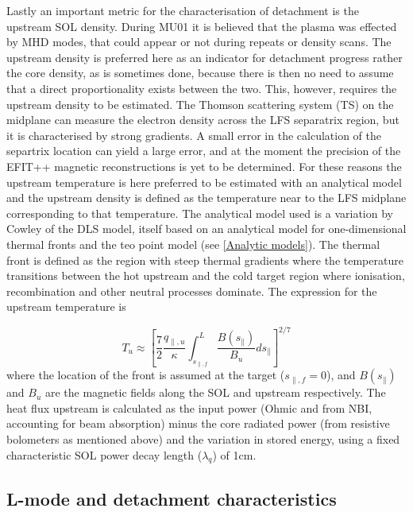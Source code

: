 Lastly an important metric for the characterisation of detachment is the upstream SOL density. During MU01 it is believed that the plasma was effected by MHD modes, that could appear or not during repeats or density scans. The upstream density is preferred here as an indicator for detachment progress rather the core density, as is sometimes done, because there is then no need to assume that a direct proportionality exists between the two. This, however, requires the upstream density to be estimated. The Thomson scattering system (TS) on the midplane can measure the electron density across the LFS separatrix region, but it is characterised by strong gradients. A small error in the calculation of the separtrix location can yield a large error, and at the moment the precision of the EFIT++ magnetic reconstructions is yet to be determined. %
For these reasons the upstream temperature is here preferred to be estimated with an analytical model and the upstream density is defined as the temperature near to the LFS midplane corresponding to that temperature. The analytical model used is a variation by Cowley\cite{Cowley2022} of the DLS model\cite{Lipschultz2016}, itself based on an analytical model for one-dimensional thermal fronts\cite{Hutchinson1994} and the teo point model (see \autoref{Analytic models}). The thermal front is defined as the region with steep thermal gradients where the temperature transitions between the hot upstream and the cold target region where ionisation, recombination and other neutral processes dominate. The expression for the upstream temperature is\cite{Cowley2022}

\begin{equation}
T_u \approx \left [ \frac{7}{2} \frac{q_{\parallel,u}}{\kappa} \int_{s_{\parallel,f}}^{L} \frac{B(s_{\parallel})}{B_u} ds_{\parallel} \right ]^{2/7}
\label{eq:thomo1}
\end{equation}
where the location of the front is assumed at the target ($s_{\parallel,f}=0$), and $B(s_{\parallel})$ and ${B_u}$ are the magnetic fields along the SOL and upstream respectively. The heat flux upstream is calculated as the input power (Ohmic and from NBI, accounting for beam absorption) minus the core radiated power (from resistive bolometers as mentioned above) and the variation in stored energy, using a fixed characteristic SOL power decay length ($\lambda_q$) of 1cm.

\subsection{L-mode and detachment characteristics}

